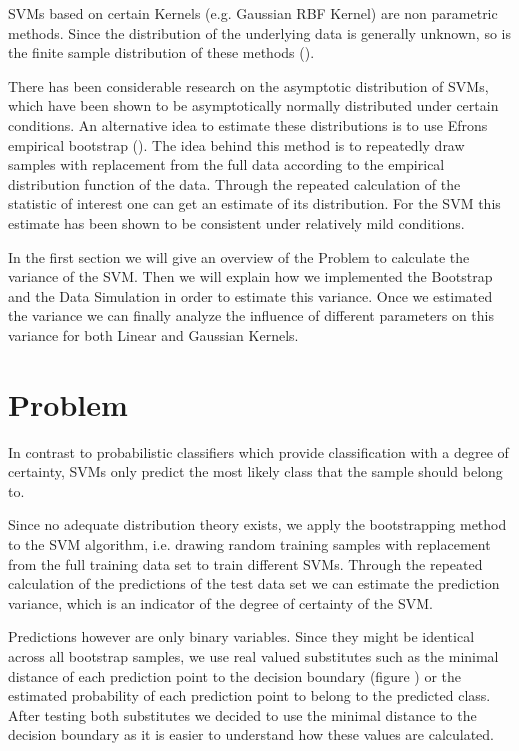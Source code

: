 \documentclass[a4paper]{article}
\begin{document}
SVMs based on certain Kernels (e.g. Gaussian RBF Kernel) are non parametric methods. Since the distribution of the underlying data is generally unknown, so is the finite sample distribution of these methods (\cite{hastie_elements_2005}).

There has been considerable research on the asymptotic distribution of SVMs, which have been shown to be asymptotically normally distributed under certain conditions. An alternative idea to estimate these distributions is to use Efrons empirical bootstrap (\cite{efron_introduction_1994}). The idea behind this method is to repeatedly draw samples with replacement from the full data according to the empirical distribution function of the data. Through the repeated calculation of the statistic of interest one can get an estimate of its distribution. For the SVM this estimate has been shown to be consistent under relatively mild conditions.
    
In the first section we will give an overview of the Problem to calculate the variance of the SVM. Then we will explain how we implemented the Bootstrap and the Data Simulation in order to estimate this variance. Once we estimated the variance we can finally analyze the influence of different parameters on this variance for both Linear and Gaussian Kernels.

\section{Problem}
In contrast to probabilistic classifiers which provide classification with a degree of certainty, SVMs only predict the most likely class that the sample should belong to.  

Since no adequate distribution theory exists, we apply the bootstrapping method to the SVM algorithm, i.e. drawing random training samples with replacement from the full training data set to train different SVMs. Through the repeated calculation of the predictions of the test data set we can estimate the prediction variance, which is an indicator of the degree of certainty of the SVM. 

Predictions however are only binary variables. Since they might be identical across all bootstrap samples, we use real valued substitutes such as the minimal distance of each prediction point to the decision boundary (figure \label{fig1}) or the estimated probability of each prediction point to belong to the predicted class. After testing both substitutes we decided to use the minimal distance to the decision boundary as it is easier to understand how these values are calculated. 
\end{document}
